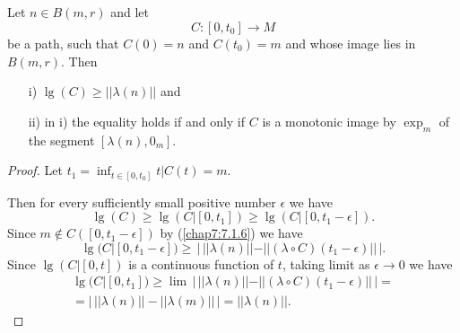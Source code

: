 \subsection{}\label{chap7:7.1.22}

\begin{lemma*}
Let $n\in B(m,r)$ and let
$$
C:[0,t_{0}]\to M
$$
be a path, such that $C(0)=n$ and $C(t_{0})=m$ and whose image lies in
$B(m,r)$. Then
\begin{itemize}
\item[\rm i)] $\lg(C)\geq ||\lambda(n)||$ and

\item[\rm ii)] in {\rm i)} the equality holds if and only if $C$ is a
  monotonic image by $\exp_{m}$ of the segment $[\lambda(n),0_{m}]$. 
\end{itemize}
\end{lemma*}

\begin{proof}
Let $t_{1}=\inf_{t\in [0,t_{0}]}t|C(t)=m$.

Then for every sufficiently small positive number $\epsilon$ we have
\begin{equation*}
\lg(C)\geq
\lg(C|[0,t_{1}])\geq\lg(C|[0,t_{1}-\epsilon]).\tag{7.1.23}\label{chap7:7.1.23} 
\end{equation*}
Since $m\not\in C([0,t_{1}-\epsilon])$ by (\ref{chap7:7.1.6}) we have
\begin{equation*}
\lg(C|[0,t_{1}-\epsilon])\geq \,\big|\,||\lambda(n)||-||(\lambda\circ
C)(t_{1}-\epsilon)||\,\big|.\tag{7.1.24}\label{chap7:7.1.24} 
\end{equation*}
Since $\lg(C|[0,t])$ is a continuous function of $t$, taking limit as
$\epsilon\to 0$ we have
\begin{gather*}
\lg(C|[0,t_{1}])\geq \lim\,\big|\,||\lambda(n)||-||(\lambda\circ
C)(t_{1}-\epsilon)||\,\big|=\\
=\big|\,||\lambda(n)||-||\lambda(m)||\,\big|=||\lambda(n)||.\tag{7.1.25}\label{chap7:7.1.25} 
\end{gather*}
\end{proof}

\setcounter{subsection}{25}
